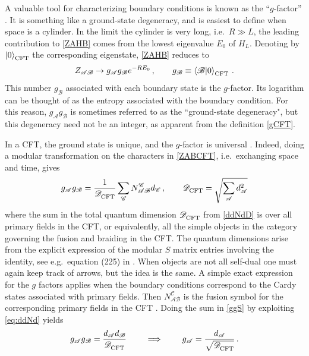 A valuable tool for characterizing boundary conditions is known as the ``$g$-factor'' \cite{AffleckLudwig}. It is something like a ground-state degeneracy, and is easiest to define when space is a cylinder. In the limit the cylinder is very long, i.e.\ $R\gg L$, the leading contribution to \eqref{ZAHB} comes from the lowest eigenvalue $E_0$ of $H_L$. Denoting by $\ket{0}_{\rm CFT}^{}$ the corresponding eigenstate, \eqref{ZAHB} reduces to 
\begin{align}
	Z_{\mathscr{AB}}  \rightarrow g_\mathscr{A}g_\mathscr{B} e^{-R E_0 } \,,\qquad g_\mathscr{B}\equiv \braket{\mathscr{B}|0}_{\rm CFT}^{}\,.
	\label{gCFT}
\end{align}
This number $g_\mathscr{B}$ associated with each boundary state is the $g$-factor.   Its logarithm can be thought of as the entropy associated with the boundary condition. For this reason, $g_\mathscr{A}g_\mathscr{B}$ is sometimes referred to as the ``ground-state degeneracy", but this degeneracy need not be an integer, as apparent from the definition \eqref{gCFT}.

In a CFT, the ground state is unique, and the $g$-factor is universal \cite{AffleckLudwig}.  Indeed, doing a modular transformation on the characters in \eqref{ZABCFT}, i.e.\ exchanging space and time, gives \cite{Cardy1989,AffleckLudwig}
\begin{align}
g_\mathscr{A} g_\mathscr{B} = \frac{1}{\mathscr{D}_{\rm CFT}^{}}\sum_\mathscr{C} N^\mathscr{C}_{\mathscr{AB}} d_\mathscr{C} \,,\qquad \mathscr{D}_{\rm CFT}^{}=\sqrt{\sum_{\mathscr{A}} d_\mathscr{A}^2}
\label{ggS}
\end{align}
where the sum in the total quantum dimension $\mathscr{D}_{\rm CFT}^{}$ from \eqref{ddNdD} is over all primary fields in the CFT, or equivalently, all the simple objects in the category governing the fusion and braiding in the CFT. The quantum dimensions arise from the explicit expression of the modular $S$ matrix entries involving the identity, see e.g.\ equation (225) in \cite{Kitaev2006}. When objects are not all self-dual one must again keep track of arrows, but the idea is the same. 
A simple exact expression for the $g$ factors applies when the boundary conditions correspond to the Cardy states associated with primary fields. Then $N^\mathscr{C}_{\mathscr{AB}}$ is the fusion symbol for the corresponding primary fields in the CFT \cite{Cardy1989}. Doing the sum in \eqref{ggS} by exploiting  \eqref{eq:ddNd}  yields 
\begin{align}
g_\mathscr{A} g_\mathscr{B} =  \frac{d_\mathscr{A}d_\mathscr{B}}{\mathscr{D}_{\rm CFT}^{}} \qquad \implies \qquad g_\mathscr{A}= \frac{d_\mathscr{A}}{\sqrt{\mathscr{D}_{\rm CFT}^{}}} \,.
\label{ggdd}
\end{align}


